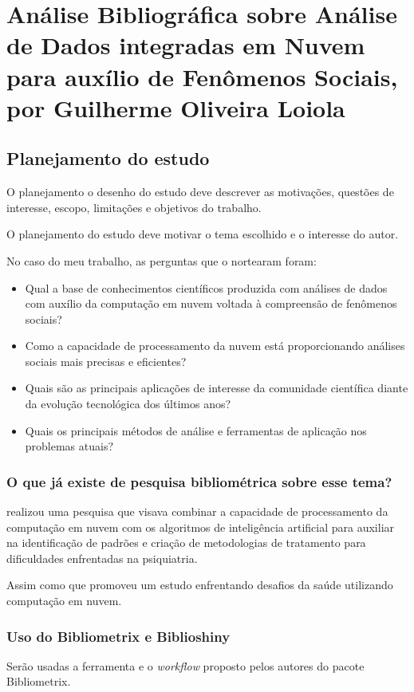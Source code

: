\chapter{Análise Bibliográfica sobre Análise de Dados integradas em Nuvem para auxílio de Fenômenos Sociais, por Guilherme Oliveira Loiola\label{chap:bibliometria:guioliunb}}

\section{Planejamento do estudo\label{MASSA:coleta}}
O planejamento o  desenho do estudo deve descrever as motivações, questões de interesse, escopo, limitações e objetivos do trabalho.

O planejamento do estudo deve motivar o tema escolhido e o interesse do autor.

No caso do meu trabalho, as perguntas que o nortearam foram:
\begin{itemize}
    \item Qual a base de conhecimentos científicos produzida com análises de dados com auxílio da computação em nuvem voltada à compreensão de fenômenos sociais? 
    \item Como a capacidade de processamento da nuvem está proporcionando análises sociais mais precisas e eficientes? 
    \item Quais são as principais aplicações de interesse da comunidade científica diante da evolução tecnológica dos últimos anos?
    \item Quais os principais métodos de análise e ferramentas de aplicação nos problemas atuais?
\end{itemize}

\subsection{O que já existe de pesquisa bibliométrica sobre esse tema?}

\cite{ma_method_2020} realizou uma pesquisa que visava  combinar a capacidade de processamento da computação em nuvem com os algoritmos de inteligência artificial para auxiliar na identificação de padrões e criação de metodologias de tratamento para dificuldades enfrentadas na psiquiatria.

Assim como \cite{archenaa_interactive_2016} que promoveu um estudo enfrentando desafios da saúde utilizando computação em nuvem.


\subsection{Uso do Bibliometrix e Biblioshiny}
Serão usadas a ferramenta e o \textit{workflow} proposto pelos autores do pacote Bibliometrix.

